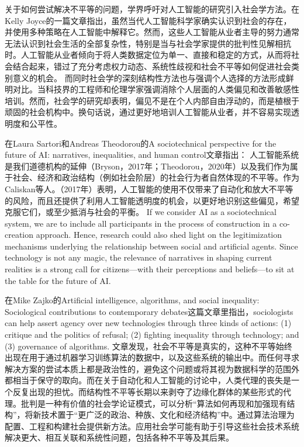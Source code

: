 \documentclass[11pt]{article}
\begin{document}
关于如何尝试解决不平等的问题，学界呼吁对人工智能的研究引入社会学方法。在Kelly Joyce的一篇文章指出，虽然当代人工智能科学家确实认识到社会的存在，并使用多种策略在人工智能中解释它。然而，这些人工智能从业者主导的努力通常无法认识到社会生活的全部复杂性，特别是当与社会学家提供的批判性见解相抗时。人工智能从业者倾向于将人类数据定位为单一、直接和稳定的方式，从而将社会结合起来，错过了充分考虑权力动态、系统性歧视和社会不平等如何促进社会类别意义的机会。
而同时社会学的深刻结构性方法也与强调个人选择的方法形成鲜明对比。当科技界的工程师和伦理学家强调消除个人层面的人类偏见和改善敏感性培训。然而，社会学的研究却表明，偏见不是在个人内部自由浮动的，而是植根于顽固的社会机构中。换句话说，通过更好地培训人工智能从业者，并不容易实现透明度和公平性。


在Laura Sartori和Andreas Theodorou的A sociotechnical perspective for the future of AI: narratives, inequalities, and human control文章指出：
人工智能系统是我们道德机构的延伸（Bryson，2017年；Theodorou，2020年）以及我们作为属于社会、经济和政治结构（例如社会阶层）的社会行为者自然体现的不平等。作为Caliskan等人。（2017年）表明，人工智能的使用不仅带来了自动化和放大不平等的风险，而且还提供了利用人工智能透明度的机会，以更好地识别这些偏见，希望克服它们，或至少抵消与社会的平衡。
If we consider AI as a sociotechnical system, we are to include all participants in the process of construction in a co-creation approach. Hence, research could also shed light on the legitimization mechanisms underlying the relationship between social and artificial agents. Since technology is not any magic, the relevance of narratives in shaping current realities is a strong call for citizens—with their perceptions and beliefs—to sit at the table for the future of AI.


在Mike Zajko的Artificial intelligence, algorithms, and social inequality: Sociological contributions to contemporary debates这篇文章里指出，sociologists can help assert agency over new technologies through three kinds of actions: (1) critique and the politics of refusal; (2) fighting inequality through technology; and (3) governance of algorithms. 文章发现，社会不平等是真实的，这种不平等始终出现在用于通过机器学习训练算法的数据中，以及这些系统的输出中。而任何寻求解决方案的尝试本质上都是政治性的，避免这个问题或将其视为数据科学的范围外都相当于保守的取向。而在关于自动化和人工智能的讨论中，人类代理的丧失是一个反复出现的担忧。而结构性不平等长期以来剥夺了边缘化群体的某些形式的代理。批判是一种有价值的社会学论证模式，可以分析“算法如何再现和加强现有结构”，将新技术置于“更广泛的政治、种族、文化和经济结构”中。通过算法治理为配置、工程和构建社会提供新方法。应用社会学可能有助于引导这些社会技术系统解决更大、相互关联和系统性问题，包括各种不平等及其后果。
\end{document}
